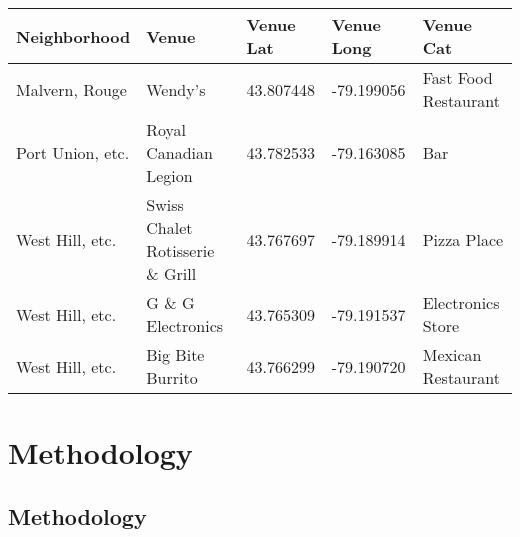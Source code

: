 \documentclass[aspectratio=169]{beamer}
\begin{document}
\begin{frame}
\footnotesize{
\begin{center}
\begin{tabular}{|l|l|l|l|l|}
Neighborhood & Venue & Venue Lat & Venue Long & Venue Cat\\\hline
Malvern, Rouge & Wendy's & 43.807448 & -79.199056 & Fast Food Restaurant\\\hline
Port Union, etc. & Royal Canadian Legion & 43.782533 & -79.163085 & Bar\\\hline
West Hill, etc. & Swiss Chalet Rotisserie \& Grill & 43.767697 & -79.189914 & Pizza Place\\\hline
West Hill, etc. & G \& G Electronics & 43.765309 & -79.191537 & Electronics Store\\\hline
West Hill, etc.  & Big Bite Burrito & 43.766299 & -79.190720 & Mexican Restaurant\\\hline
\end{tabular}
\end{center}}
\end{frame}



\section{Methodology}

\subsection{Methodology}
\end{document}
